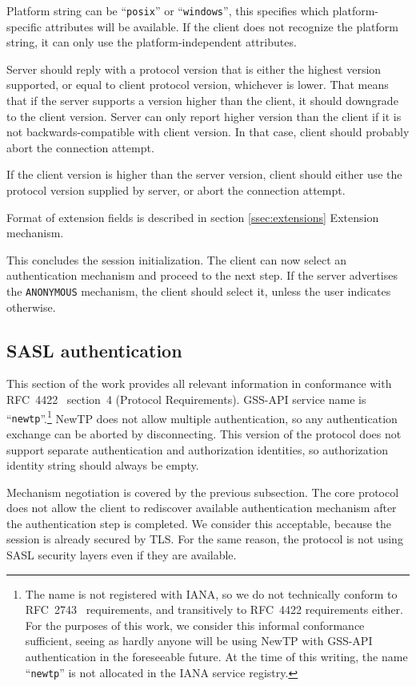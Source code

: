 Platform string can be ``{\tt posix}'' or ``{\tt windows}'', this specifies which platform-specific attributes
will be available. If the client does not recognize the platform string, it can only use the
platform-independent attributes.

Server should reply with a protocol version that is either the highest version supported, or equal to client
protocol version, whichever is lower. That means that if the server supports a version higher than the client,
it should downgrade to the client version. Server can only report higher version than the client if it is not
backwards-compatible with client version. In that case, client should probably abort the connection attempt.

If the client version is higher than the server version, client should either use the protocol version
supplied by server, or abort the connection attempt.

Format of extension fields is described in section \ref{ssec:extensions} Extension mechanism.

This concludes the session initialization. The client can now select an authentication mechanism and proceed
to the next step. If the server advertises the {\tt ANONYMOUS} mechanism, the client should select it, unless
the user indicates otherwise.

%

\subsection{SASL authentication}

This section of the work provides all relevant information in conformance with RFC~4422~\cite{rfc4422}
section~4 (Protocol Requirements). GSS-API service name is ``{\tt newtp}''.\footnote{The name is not
registered with IANA, so we do not technically conform to RFC~2743~\cite{rfc2743} requirements, and
transitively to RFC~4422 requirements either. For the purposes of this work, we consider this informal
conformance sufficient, seeing as hardly anyone will be using NewTP with GSS-API authentication in the
foreseeable future. At the time of this writing, the name ``{\tt newtp}'' is not allocated in the IANA service
registry.} NewTP does not allow multiple authentication, so any authentication exchange can be aborted by
disconnecting. This version of the protocol does not support separate authentication and authorization
identities, so authorization identity string should always be empty.

Mechanism negotiation is covered by the previous subsection. The core protocol does not allow the client to
rediscover available authentication mechanism after the authentication step is completed. We consider this
acceptable, because the session is already secured by TLS. For the same reason, the protocol is not using SASL
security layers even if they are available.

